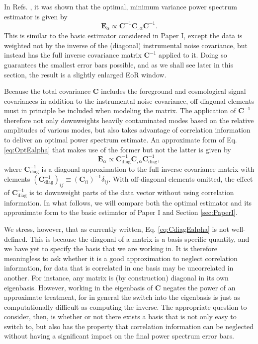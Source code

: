 \documentclass[twocolumn,aps,prd,nofootinbib,showpacs]{revtex4-1}
\begin{document}
In Refs. \cite{Tegmark1997b,Bond1998}, it was shown that the optimal, minimum variance power spectrum estimator is given by
\begin{equation}
\label{eq:OptEalpha}
\mathbf{E}_\alpha \propto \mathbf{C}^{-1} \mathbf{C}_{,\alpha} \mathbf{C}^{-1}.
\end{equation}
This is similar to the basic estimator considered in Paper I, except the data is weighted not by the inverse of the (diagonal) instrumental noise covariance, but instead has the full inverse covariance matrix $\mathbf{C}^{-1}$ applied to it.  Doing so guarantees the smallest error bars possible, and as we shall see later in this section, the result is a slightly enlarged EoR window.

Because the total covariance $\mathbf{C}$ includes the foreground and cosmological signal covariances in addition to the instrumental noise covariance, off-diagonal elements must in principle be included when modeling the matrix.  The application of $\mathbf{C}^{-1}$ therefore not only downweights heavily contaminated modes based on the relative amplitudes of various modes, but also takes advantage of correlation information to deliver an optimal power spectrum estimate.  An approximate form of Eq. \eqref{eq:OptEalpha} that makes use of the former but not the latter is given by
\begin{equation}
\label{eq:CdiagEalpha}
\mathbf{E}_\alpha \propto \mathbf{C}^{-1}_\textrm{diag} \mathbf{C}_{,\alpha} \mathbf{C}^{-1}_\textrm{diag},
\end{equation}
where $\mathbf{C}^{-1}_\textrm{diag}$ is a diagonal approximation to the full inverse covariance matrix with elements $(\mathbf{C}_\textrm{diag}^{-1})_{ij} \equiv (\mathbf{C}_{ii})^{-1} \delta_{ij}$.  With off-diagonal elements omitted, the effect of $\mathbf{C}^{-1}_\textrm{diag}$ is to downweight parts of the data vector without using correlation information.  In what follows, we will compare both the optimal estimator and its approximate form to the basic estimator of Paper I and Section \ref{sec:PaperI}.

We stress, however, that as currently written, Eq. \eqref{eq:CdiagEalpha} is not well-defined.  This is because the diagonal of a matrix is a basis-specific quantity, and we have yet to specify the basis that we are working in.  It is therefore meaningless to ask whether it is a good approximation to neglect correlation information, for data that is correlated in one basis may be uncorrelated in another.  For instance, any matrix is (by construction) diagonal in its own eigenbasis.  However, working in the eigenbasis of $\mathbf{C}$ negates the power of an approximate treatment, for in general the switch into the eigenbasis is just as computationally difficult as computing the inverse.  The appropriate question to consider, then, is whether or not there exists a basis that is not only easy to switch to, but also has the property that correlation information can be neglected without having a significant impact on the final power spectrum error bars.
\end{document}
